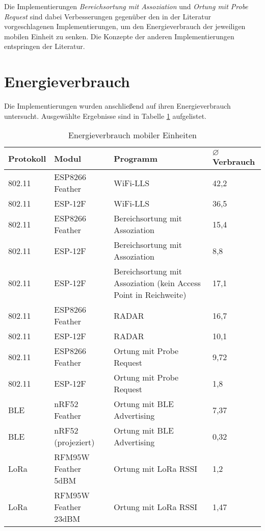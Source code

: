 Die Implementierungen \emph{Bereichsortung mit Assoziation} und \emph{Ortung mit Probe Request} sind dabei Verbesserungen gegenüber den in der Literatur vorgeschlagenen Implementierungen, um den Energieverbrauch der jeweiligen mobilen Einheit zu senken.
Die Konzepte der anderen Implementierungen entspringen der Literatur.

\section{Energieverbrauch}
Die Implementierungen wurden anschließend auf ihren Energieverbrauch untersucht.
Ausgewählte Ergebnisse sind in Tabelle \ref{table:consumptions} aufgelistet.


\begin{table}[h]
	\centering
	\caption{Energieverbrauch mobiler Einheiten}
	\label{table:consumptions}
	\begin{tabular}{p{1.8cm}|p{3.5cm}|p{6cm}|p{2.3cm}}
		Protokoll & Modul & Programm  & $\varnothing$ Verbrauch\\
		\hline
		802.11 & ESP8266 Feather & WiFi-LLS & 42,2 \\
		802.11 & ESP-12F & WiFi-LLS & 36,5\\
		802.11 & ESP8266 Feather & Bereichsortung mit Assoziation & 15,4 \\
		802.11 & ESP-12F & Bereichsortung mit Assoziation & 8,8\\
		802.11 & ESP-12F & Bereichsortung mit Assoziation (kein Access Point in Reichweite) & 17,1\\
		\hline
		802.11 & ESP8266 Feather & RADAR & 16,7\\
		802.11 & ESP-12F & RADAR & 10,1\\
		802.11 & ESP8266 Feather & Ortung mit Probe Request & 9,72\\
		802.11 & ESP-12F & Ortung mit Probe Request & 1,8\\
		\hline
		BLE & nRF52 Feather & Ortung mit BLE Advertising & 7,37\\
		BLE & nRF52 (projeziert) & Ortung mit BLE Advertising & 0,32\\
		\hline
		LoRa & RFM95W Feather 5dBM & Ortung mit LoRa RSSI & 1,2\\
		LoRa & RFM95W Feather 23dBM & Ortung mit LoRa RSSI & 1,47\\
	\end{tabular}
\end{table}

